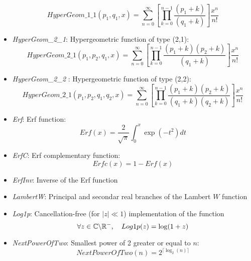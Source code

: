 \begin{itemize}
\begin{equation*}
HyperGeom\_1\_1(p_1, q_1, x) = \sum_{n=0}^{\infty} \left[\prod_{k=0}^{n-1} \frac{(p_1 + k)}{(q_1 + k)}\right]  \frac{x^n}{n!}
\end{equation*}
\item \textit{HyperGeom\_2\_1}: Hypergeometric function of type
(2,1):
\begin{equation*}
HyperGeom\_2\_1(p_1, p_2, q_1, x) = \sum_{n=0}^{\infty}
\left[\prod_{k=0}^{n-1} \frac{ (p_1 + k)(p_2 + k)}{ (q_1 + k)}\right] \frac{x^n }{ n!}
\end{equation*}
\item \textit{HyperGeom\_2\_2 }: Hypergeometric function of type (2,2):
\begin{equation*}
HyperGeom\_2\_1(p_1, p_2, q_1, q_2, x) =
\sum_{n=0}^{\infty} \left[\prod_{k=0}^{n-1} \frac{(p_1 + k)(p_2 +
k)}{ (q_1 + k)  (q_2 + k)}\right] \frac{x^n}{n!}
\end{equation*}
\item \textit{Erf}: Erf function:
\begin{equation*}
Erf(x) = \frac{2}{\sqrt{\pi}}\int_0^x \exp(-t^2) dt
\end{equation*}
\item \textit{ErfC}: Erf complementary function:
\begin{equation*}
Erfc(x) = 1 - Erf(x)
\end{equation*}
\item \textit{ErfInv}: Inverse of the Erf function
\item \textit{LambertW}: Principal and secondar real branches of the Lambert $W$ function
\item \textit{Log1p}: Cancellation-free (for $|z|\ll 1$) implementation of the function
\begin{equation*}
\forall z\in{\mathbb C}\backslash{\mathbb R}^-,\quad
Log1p(z) = \log(1+z)
\end{equation*}
\item \textit{NextPowerOfTwo}: Smallest power of 2 greater or equal to $n$:
\begin{equation*}
NextPowerOfTwo(n) = 2^{\lceil\log_2(n)\rceil}
\end{equation*}
\end{itemize}
